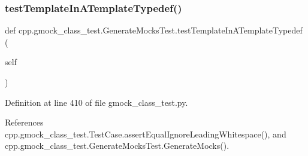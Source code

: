 \subsubsection{\texorpdfstring{test\+Template\+In\+A\+Template\+Typedef()}{testTemplateInATemplateTypedef()}}
{\footnotesize\ttfamily def cpp.\+gmock\+\_\+class\+\_\+test.\+Generate\+Mocks\+Test.\+test\+Template\+In\+A\+Template\+Typedef (\begin{DoxyParamCaption}\item[{}]{self }\end{DoxyParamCaption})}



Definition at line 410 of file gmock\+\_\+class\+\_\+test.\+py.



References cpp.\+gmock\+\_\+class\+\_\+test.\+Test\+Case.\+assert\+Equal\+Ignore\+Leading\+Whitespace(), and cpp.\+gmock\+\_\+class\+\_\+test.\+Generate\+Mocks\+Test.\+Generate\+Mocks().


